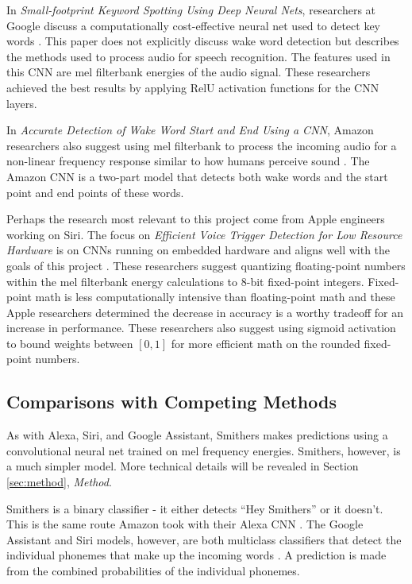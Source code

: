 \documentclass[conference]{IEEEtran}
\begin{document}
In \textit{Small-footprint Keyword Spotting Using Deep Neural Nets},
researchers at Google discuss a computationally cost-effective neural net used to detect key words \cite{smallfoot}.
This paper does not explicitly discuss wake word detection
but describes the methods used to process audio for speech recognition.
The features used in this CNN are mel filterbank energies of the audio signal.
These researchers achieved the best results
by applying RelU activation functions for the CNN layers.

In \textit{Accurate Detection of Wake Word Start and End Using a CNN}, 
Amazon researchers also suggest using mel filterbank to process the incoming audio
for a non-linear frequency response similar to how humans perceive sound \cite{wordstart}.
The Amazon CNN is a two-part model that detects both wake words
and the start point and end points of these words.

Perhaps the research most relevant to this project come from Apple engineers working on Siri.
The focus on \textit{Efficient Voice Trigger Detection for Low Resource Hardware}
is on CNNs running on embedded hardware and aligns well with the goals of this project \cite{Efficient}.
These researchers suggest quantizing floating-point numbers 
within the mel filterbank energy calculations to 8-bit fixed-point integers. 
Fixed-point math is less computationally intensive than floating-point math
and these Apple researchers determined the decrease in accuracy is a worthy tradeoff
for an increase in performance.
These researchers also suggest using sigmoid activation 
to bound weights between $[0,1]$ for more efficient math on the rounded fixed-point numbers.

\subsection{Comparisons with Competing Methods}

As with Alexa, Siri, and Google Assistant, Smithers makes predictions
using a convolutional neural net trained on mel frequency energies.
Smithers, however, is a much simpler model.
More technical details will be revealed in Section \ref{sec:method}, \textit{Method}.

Smithers is a binary classifier - it either detects ``Hey Smithers'' or it doesn't.
This is the same route Amazon took with their Alexa CNN \cite{wordstart}.
The Google Assistant and Siri models, however, are both multiclass classifiers that
detect the individual phonemes that make up the incoming words \cite{smallfoot}\cite{Efficient}.
A prediction is made from the combined probabilities of the individual phonemes.
\end{document}
